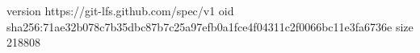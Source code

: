 version https://git-lfs.github.com/spec/v1
oid sha256:71ae32b078c7b35dbc87b7c25a97efb0a1fce4f04311c2f0066bc11e3fa6736e
size 218808
